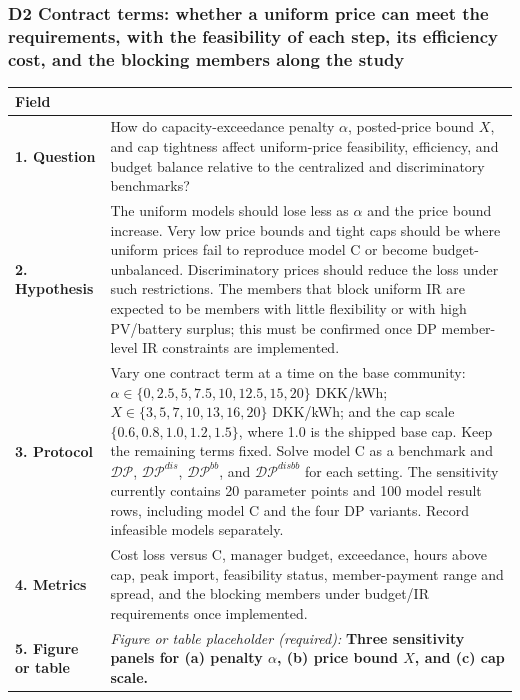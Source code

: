 \documentclass[]{article}
\begin{document}
\subsubsection{D2 Contract terms: whether a uniform price can meet the
requirements, with the feasibility of each step, its efficiency cost,
and the blocking members along the study}
\label{d2-contract-terms}

\begin{longtable}[]{@{}
>{\raggedright\arraybackslash}p{}
>{\raggedright\arraybackslash}p{}@{}}
\toprule
Field & \\
\midrule
\endhead
\textbf{1. Question} &
How do capacity-exceedance penalty \(\alpha\), posted-price bound \(X\),
and cap tightness affect uniform-price feasibility, efficiency, and
budget balance relative to the centralized and discriminatory benchmarks? \\
\textbf{2. Hypothesis} &
The uniform models should lose less as \(\alpha\) and the price bound
increase. Very low price bounds and tight caps should be where uniform
prices fail to reproduce model C or become budget-unbalanced.
Discriminatory prices should reduce the loss under such restrictions.
The members that block uniform IR are expected to be members with little
flexibility or with high PV/battery surplus; this must be confirmed once
DP member-level IR constraints are implemented. \\
\textbf{3. Protocol} &
Vary one contract term at a time on the base community:
\(\alpha\in\{0,2.5,5,7.5,10,12.5,15,20\}\) DKK/kWh;
\(X\in\{3,5,7,10,13,16,20\}\) DKK/kWh; and the cap scale
\(\{0.6,0.8,1.0,1.2,1.5\}\), where 1.0 is the shipped base cap.
Keep the remaining terms fixed. Solve model C as a benchmark and
\(\mathcal{DP}\), \(\mathcal{DP}^{dis}\),
\(\mathcal{DP}^{bb}\), and \(\mathcal{DP}^{disbb}\) for each setting.
The sensitivity currently contains 20 parameter points and 100 model
result rows, including model C and the four DP variants. Record infeasible
models separately. \\
\textbf{4. Metrics} &
Cost loss versus C, manager budget, exceedance, hours above cap, peak
import, feasibility status, member-payment range and spread, and the
blocking members under budget/IR requirements once implemented. \\
\textbf{5. Figure or table} &
\emph{Figure or table placeholder (required):}
\textbf{Three sensitivity panels for (a) penalty \(\alpha\),
(b) price bound \(X\), and (c) cap scale.}

\end{longtable}
\end{document}
